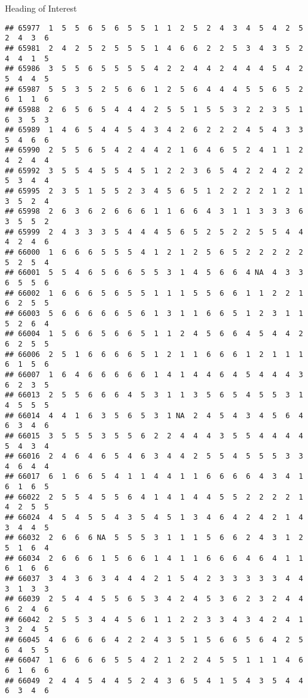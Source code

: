 \documentclass[
  ignorenonframetext,
]{beamer}
\begin{document}
\begin{frame}[fragile]{Heading of Interest}
\begin{verbatim}
## 65977  1  5  5  6  5  6  5  5  1  1  2  5  2  4  3  4  5  4  2  5  2  4  3  6
## 65981  2  4  2  5  2  5  5  5  1  4  6  6  2  2  5  3  4  3  5  2  4  4  1  5
## 65986  3  5  5  6  5  5  5  5  4  2  2  4  4  2  4  4  4  5  4  2  5  4  4  5
## 65987  5  5  3  5  2  5  6  6  1  2  5  6  4  4  4  5  5  6  5  2  6  1  1  6
## 65988  2  6  5  6  5  4  4  4  2  5  5  1  5  5  3  2  2  3  5  1  6  3  5  3
## 65989  1  4  6  5  4  4  5  4  3  4  2  6  2  2  2  4  5  4  3  3  5  4  6  6
## 65990  2  5  5  6  5  4  2  4  4  2  1  6  4  6  5  2  4  1  1  2  4  2  4  4
## 65992  3  5  5  4  5  5  4  5  1  2  2  3  6  5  4  2  2  4  2  2  5  3  4  4
## 65995  2  3  5  1  5  5  2  3  4  5  6  5  1  2  2  2  2  1  2  1  3  5  2  4
## 65998  2  6  3  6  2  6  6  6  1  1  6  6  4  3  1  1  3  3  3  6  3  5  5  2
## 65999  2  4  3  3  3  5  4  4  4  5  6  5  2  5  2  2  5  5  4  4  4  2  4  6
## 66000  1  6  6  6  5  5  5  4  1  2  1  2  5  6  5  2  2  2  2  2  5  2  5  4
## 66001  5  5  4  6  5  6  6  5  5  3  1  4  5  6  6  4 NA  4  3  3  6  5  5  6
## 66002  1  6  6  6  5  6  5  5  1  1  1  5  5  6  6  1  1  2  2  1  6  2  5  5
## 66003  5  6  6  6  6  6  5  6  1  3  1  1  6  6  5  1  2  3  1  1  5  2  6  4
## 66004  1  5  6  6  5  6  6  5  1  1  2  4  5  6  6  4  5  4  4  2  6  2  5  5
## 66006  2  5  1  6  6  6  6  5  1  2  1  1  6  6  6  1  2  1  1  1  6  1  5  6
## 66007  1  6  4  6  6  6  6  6  1  4  1  4  4  6  4  5  4  4  4  3  6  2  3  5
## 66013  2  5  5  6  6  6  4  5  3  1  1  3  5  6  5  4  5  5  3  1  4  5  5  5
## 66014  4  4  1  6  3  5  6  5  3  1 NA  2  4  5  4  3  4  5  6  4  6  3  4  6
## 66015  3  5  5  5  3  5  5  6  2  2  4  4  4  3  5  5  4  4  4  4  5  4  3  4
## 66016  2  4  6  4  6  5  4  6  3  4  4  2  5  5  4  5  5  5  3  3  4  6  4  4
## 66017  6  1  6  6  5  4  1  1  4  4  1  1  6  6  6  6  4  3  4  1  6  1  6  5
## 66022  2  5  5  4  5  5  6  4  1  4  1  4  4  5  5  2  2  2  2  1  4  2  5  5
## 66024  4  5  4  5  5  4  3  5  4  5  1  3  4  6  4  2  4  2  1  4  3  4  4  5
## 66032  2  6  6  6 NA  5  5  5  3  1  1  1  5  6  6  2  4  3  1  2  5  1  6  4
## 66034  2  6  6  6  1  5  6  6  1  4  1  1  6  6  6  4  6  4  1  1  6  1  6  6
## 66037  3  4  3  6  3  4  4  4  2  1  5  4  2  3  3  3  3  3  4  4  3  1  3  3
## 66039  2  5  4  4  5  5  6  5  3  4  2  4  5  3  6  2  3  2  4  4  6  2  4  6
## 66042  2  5  5  3  4  4  5  6  1  1  2  2  3  3  4  3  4  2  4  1  3  2  4  5
## 66045  4  6  6  6  6  4  2  2  4  3  5  1  5  6  6  5  6  4  2  5  6  4  5  5
## 66047  1  6  6  6  6  5  5  4  2  1  2  2  4  5  5  1  1  1  4  6  6  1  6  6
## 66049  2  4  4  5  4  4  5  2  4  3  6  5  4  1  5  4  3  5  4  4  6  3  4  6

\end{verbatim}
\end{frame}
\end{document}
